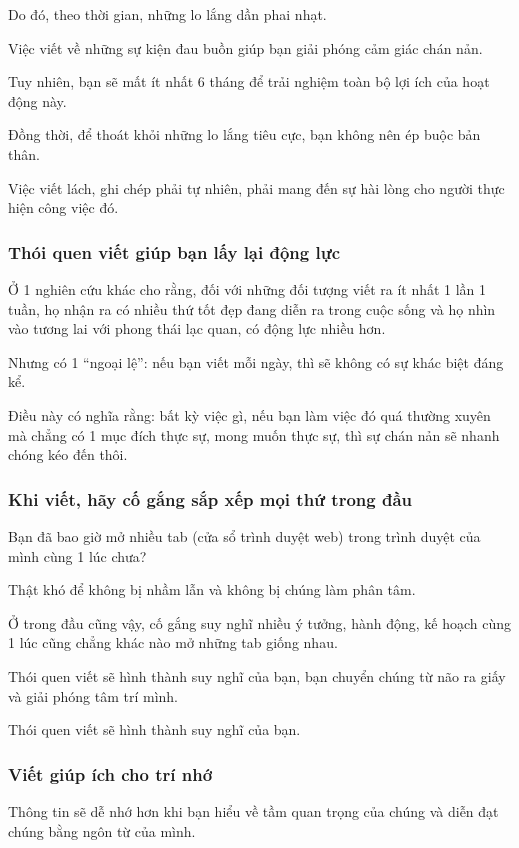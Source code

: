 \documentclass{article}
\begin{document}
Do đó, theo thời gian, những lo lắng dần phai nhạt.

%
Việc viết về những sự kiện đau buồn giúp bạn giải phóng cảm giác chán nản.

Tuy nhiên, bạn sẽ mất ít nhất 6 tháng để trải nghiệm toàn bộ lợi ích của hoạt động này.

Đồng thời, để thoát khỏi những lo lắng tiêu cực, bạn không nên ép buộc bản thân.

Việc viết lách, ghi chép phải tự nhiên, phải mang đến sự hài lòng cho người thực hiện công việc đó.

\subsubsection{Thói quen viết giúp bạn lấy lại động lực}
Ở 1 nghiên cứu khác cho rằng, đối với những đối tượng viết ra ít nhất 1 lần 1 tuần, họ nhận ra có nhiều thứ tốt đẹp đang diễn ra trong cuộc sống và họ nhìn vào tương lai với phong thái lạc quan, có động lực nhiều hơn.

%
Nhưng có 1 ``ngoại lệ'': nếu bạn viết mỗi ngày, thì sẽ không có sự khác biệt đáng kể.

Điều này có nghĩa rằng: bất kỳ việc gì, nếu bạn làm việc đó quá thường xuyên mà chẳng có 1 mục đích thực sự, mong muốn thực sự, thì sự chán nản sẽ nhanh chóng kéo đến thôi.

\subsubsection{Khi viết, hãy cố gắng sắp xếp mọi thứ trong đầu}
Bạn đã bao giờ mở nhiều tab (cửa sổ trình duyệt web) trong trình duyệt của mình cùng 1 lúc chưa?

Thật khó để không bị nhầm lẫn và không bị chúng làm phân tâm.

Ở trong đầu cũng vậy, cố gắng suy nghĩ nhiều ý tưởng, hành động, kế hoạch cùng 1 lúc cũng chẳng khác nào mở những tab giống nhau.

Thói quen viết sẽ hình thành suy nghĩ của bạn, bạn chuyển chúng từ não ra giấy và giải phóng tâm trí mình.

\textsf{Thói quen viết sẽ hình thành suy nghĩ của bạn.}

\subsubsection{Viết giúp ích cho trí nhớ}
Thông tin sẽ dễ nhớ hơn khi bạn hiểu về tầm quan trọng của chúng và diễn đạt chúng bằng ngôn từ của mình.
\end{document}
